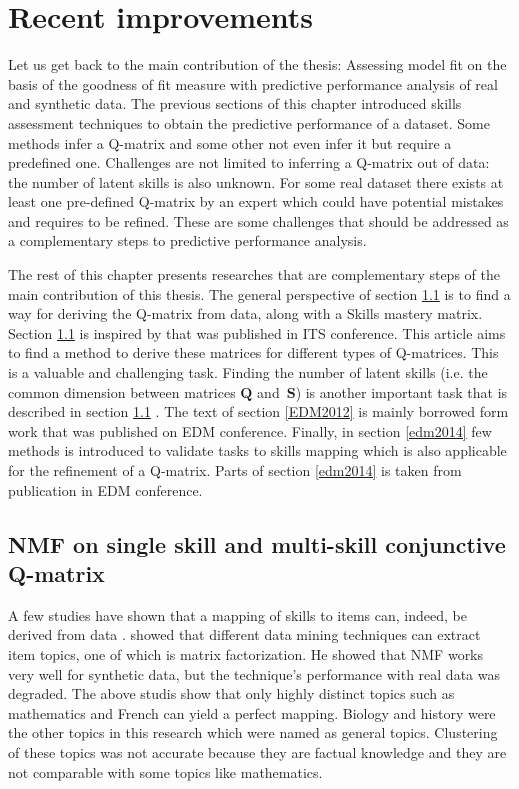\section{Recent improvements}

Let us get back to the main contribution of the thesis:  Assessing model fit on the basis of the goodness of fit measure with predictive performance analysis of real and synthetic data. The previous sections of this chapter introduced skills assessment techniques to obtain the predictive performance of a dataset. Some methods infer a Q-matrix and some other not even infer it but require a predefined one. Challenges are not limited to inferring a Q-matrix out of data: the number of latent skills is also unknown. For some real dataset there exists at least one pre-defined Q-matrix  by an expert which could have potential mistakes and requires to be refined. These are some challenges that should be addressed as a complementary steps to predictive performance analysis.

The rest of this chapter presents researches that are complementary steps of the main contribution of this thesis. The general perspective of section \ref{ITS2012} is to find a way for deriving the Q-matrix from data, along with a Skills mastery matrix. Section \ref{ITS2012} is inspired by \citet{desmarais2012mapping} that was published in ITS conference. This article aims to find a method to derive these matrices for different types of Q-matrices. This is a valuable and challenging task. Finding the number of latent skills (i.e. the common dimension between matrices $\mathbf{Q}$ and~$\mathbf{S}$) is another important task that is described in section \ref{ITS2012} . The text of section \ref{EDM2012} is mainly borrowed form \citet{Beheshti2012Numbers} work that was published on EDM conference. Finally, in section \ref{edm2014} few methods is introduced to validate tasks to skills mapping which is also applicable for the refinement of a Q-matrix. Parts of section \ref{edm2014} is taken from \citet{desmarais2014refinement} publication in EDM conference.


\subsection{NMF on single skill and multi-skill conjunctive Q-matrix}
\label{ITS2012}

A few studies have shown that a mapping of skills to items can, indeed, be derived from data \citep{winters2006,desmarais2011conditions}. \citet{Winters2006} showed that different data mining techniques can extract item topics, one of which is matrix factorization. He showed that NMF works very well for synthetic data, but the technique's performance with real data was degraded. The above studis show that only highly distinct topics such as mathematics and French can yield a perfect mapping. Biology and history were the other topics in this research which were named as general topics. Clustering of these topics was not accurate because they are factual knowledge and they are not comparable with some topics like mathematics.

